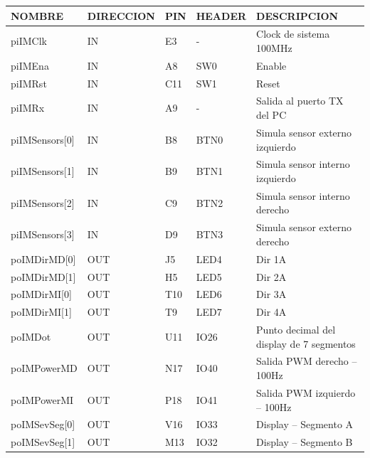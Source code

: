 \documentclass[12pt]{article}
\begin{document}
{
\begin{tabular}{|p{2.5cm}|p{2.5cm}|p{1.3cm}|p{1.8cm}|p{7.5cm}|}
\hline			
\textbf{NOMBRE} & \textbf{DIRECCION} & \textbf{PIN}	& \textbf{HEADER} & \textbf{DESCRIPCION} \\
\hline
piIMClk &
IN &
E3 &
- &
Clock de sistema 100MHz
\\

piIMEna &
IN &
A8 &
SW0 &
Enable
\\

piIMRst &
IN &
C11 &
SW1 &
Reset
\\

piIMRx &
IN &
A9 &
- &
Salida al puerto TX del PC
\\

piIMSensors[0] &
IN &
B8 &
BTN0 &
Simula sensor externo izquierdo
\\

piIMSensors[1] &
IN &
B9 &
BTN1 &
Simula sensor interno izquierdo
\\

piIMSensors[2] &
IN &
C9 &
BTN2 &
Simula sensor interno derecho
\\

piIMSensors[3] &
IN &
D9 &
BTN3 &
Simula sensor externo derecho
\\

poIMDirMD[0] &
OUT &
J5 &
LED4 &
Dir 1A
\\

poIMDirMD[1] &
OUT &
H5 &
LED5 &
Dir 2A
\\

poIMDirMI[0] &
OUT &
T10 &
LED6 &
Dir 3A
\\

poIMDirMI[1] &
OUT &
T9 &
LED7 &
Dir 4A
\\

poIMDot &
OUT &
U11 &
IO26 &
Punto decimal del display de 7 segmentos
\\

poIMPowerMD &
OUT &
N17 &
IO40 &
Salida PWM derecho – 100Hz
\\

poIMPowerMI &
OUT &
P18 &
IO41 &
Salida PWM izquierdo – 100Hz
\\

poIMSevSeg[0] &
OUT &
V16 &
IO33 &
Display – Segmento A
\\

poIMSevSeg[1] &
OUT &
M13 &
IO32 &
Display – Segmento B
\\


\end{tabular}}
\end{document}
